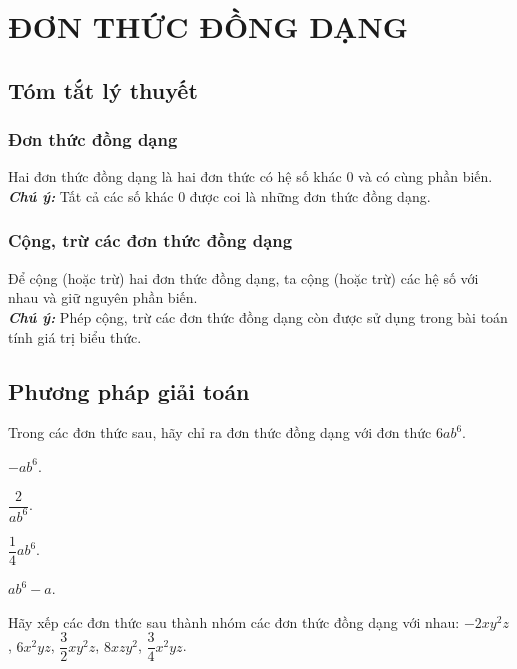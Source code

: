 \newpage
\section{ĐƠN THỨC ĐỒNG DẠNG}
\subsection{Tóm tắt lý thuyết}
\subsubsection{Đơn thức đồng dạng}
Hai đơn thức đồng dạng là hai đơn thức có hệ số khác $0$ và có cùng phần biến.\\
\textbf{\textit{Chú ý:}} Tất cả các số khác $0$ được coi là những đơn thức đồng dạng.
\subsubsection{Cộng, trừ các đơn thức đồng dạng}
Để cộng (hoặc trừ) hai đơn thức đồng dạng, ta cộng (hoặc trừ) các hệ số với nhau và giữ nguyên phần biến.\\
\textbf{\textit{Chú ý:}} Phép cộng, trừ các đơn thức đồng dạng còn được sử dụng trong bài toán tính giá trị biểu thức.

\subsection{Phương pháp giải toán}
\begin{vd}%
Trong các đơn thức sau, hãy chỉ ra đơn thức đồng dạng với đơn thức $6ab^6$.
\begin{listEX}[4]
	\item  $-ab^6$.
	\item $\dfrac{2}{ab^6}$.
	\item $\dfrac{1}{4}ab^6$.
	\item  $ab^6-a$.
\end{listEX}
\end{vd}

\begin{vd}%
	Hãy xếp các đơn thức sau thành nhóm các đơn thức đồng dạng với nhau: $-2xy^2z$, $6x^2yz$, $\dfrac{3}{2}xy^2z$, $8xzy^2$, $\dfrac{3}{4}x^2yz$.
\end{vd}

